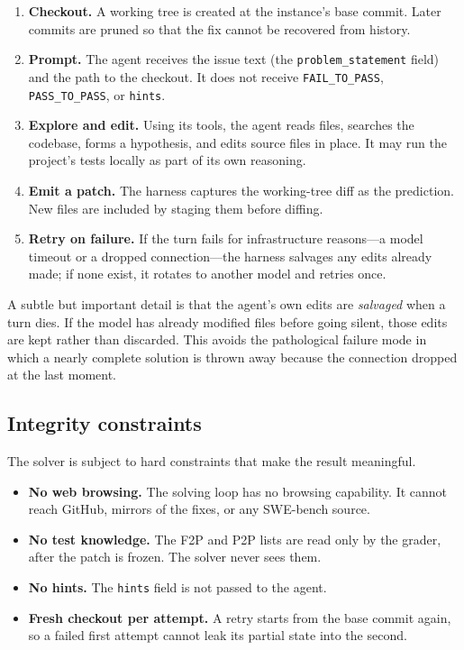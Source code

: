 \documentclass[11pt,a4paper]{article}
\begin{document}
\begin{enumerate}[leftmargin=1.4em]
  \item \textbf{Checkout.} A working tree is created at the instance's base commit.
  Later commits are pruned so that the fix cannot be recovered from history.
  \item \textbf{Prompt.} The agent receives the issue text (the \texttt{problem\_statement}
  field) and the path to the checkout. It does not receive \texttt{FAIL\_TO\_PASS},
  \texttt{PASS\_TO\_PASS}, or \texttt{hints}.
  \item \textbf{Explore and edit.} Using its tools, the agent reads files, searches the
  codebase, forms a hypothesis, and edits source files in place. It may run the project's
  tests locally as part of its own reasoning.
  \item \textbf{Emit a patch.} The harness captures the working-tree diff as the
  prediction. New files are included by staging them before diffing.
  \item \textbf{Retry on failure.} If the turn fails for infrastructure reasons---a model
  timeout or a dropped connection---the harness salvages any edits already made; if none
  exist, it rotates to another model and retries once.
\end{enumerate}

A subtle but important detail is that the agent's own edits are \emph{salvaged} when a
turn dies. If the model has already modified files before going silent, those edits are
kept rather than discarded. This avoids the pathological failure mode in which a nearly
complete solution is thrown away because the connection dropped at the last moment.

\subsection{Integrity constraints}

The solver is subject to hard constraints that make the result meaningful.

\begin{itemize}[leftmargin=1.4em]
  \item \textbf{No web browsing.} The solving loop has no browsing capability. It cannot
  reach GitHub, mirrors of the fixes, or any SWE-bench source.
  \item \textbf{No test knowledge.} The F2P and P2P lists are read only by the grader,
  after the patch is frozen. The solver never sees them.
  \item \textbf{No hints.} The \texttt{hints} field is not passed to the agent.
  \item \textbf{Fresh checkout per attempt.} A retry starts from the base commit again,
  so a failed first attempt cannot leak its partial state into the second.
\end{itemize}
\end{document}
